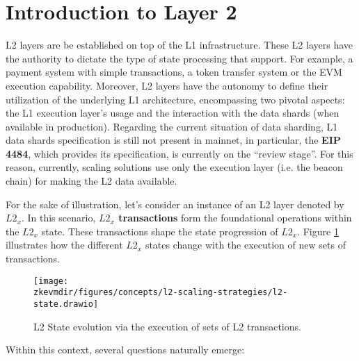 

\section{Introduction to Layer 2}


L2 layers are be established on top of the L1 infrastructure. These L2 layers have the authority to dictate the type of state processing that support. For example, a payment system with simple transactions, a token transfer system or the EVM execution capability. Moreover, L2 layers have the autonomy to define their utilization of the underlying L1 architecture, encompassing two pivotal aspects: the L1 execution layer's usage and the interaction with the data shards (when available in production). Regarding the current situation of data sharding, L1 data shards specification is still not present in mainnet, in particular, the \textbf{EIP 4484}, which provides its specification, is currently on the ``review stage''. For this reason, currently, scaling solutions use only the execution layer (i.e. the beacon chain) for making the L2 data available.

For the sake of illustration, let's consider an instance of an L2 layer denoted by $L2_x$. In this scenario, \textbf{$L2_x$ transactions} form the foundational operations within the $L2_x$ state. These transactions shape the state progression of $L2_x$. Figure \ref{fig:l2-state-sequence} illustrates how the different $L2_x$ states change with the execution of new sets of transactions.

\begin{figure}[H]
\centering
\texttt{[image: \\zkevmdir/figures/concepts/l2-scaling-strategies/l2-state.drawio]}
\caption{L2 State evolution via the execution of sets of L2 transactions.}
\label{fig:l2-state-sequence}
\end{figure}

Within this context, several questions naturally emerge:

